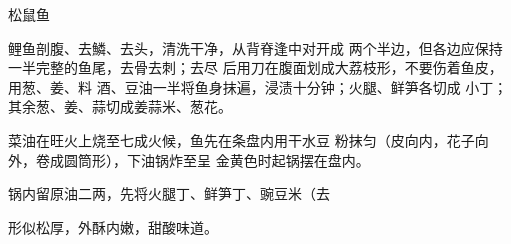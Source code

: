 \begin{recipe}{松鼠鱼}

\ingredients


\cooking

\step 鲤鱼剖腹、去鱗、去头，清洗干净，从背脊逢中对开成 两个半边，但各边应保持一半完整的鱼尾，去骨去刺；去尽 后用刀在腹面划成大荔枝形，不要伤着鱼皮，用葱、姜、料 酒、豆油一半将鱼身抹遍，浸渍十分钟；火腿、鲜笋各切成 小丁；其余葱、姜、蒜切成姜蒜米、葱花。

\step 菜油在旺火上烧至七成火候，鱼先在条盘内用干水豆 粉抹匀（皮向内，花子向外，卷成圆筒形），下油锅炸至呈 金黄色时起锅摆在盘内。

\step 锅内留原油二两，先将火腿丁、鲜笋丁、豌豆米（去

\notes

形似松厚，外酥内嫩，甜酸味道。

\end{recipe}

